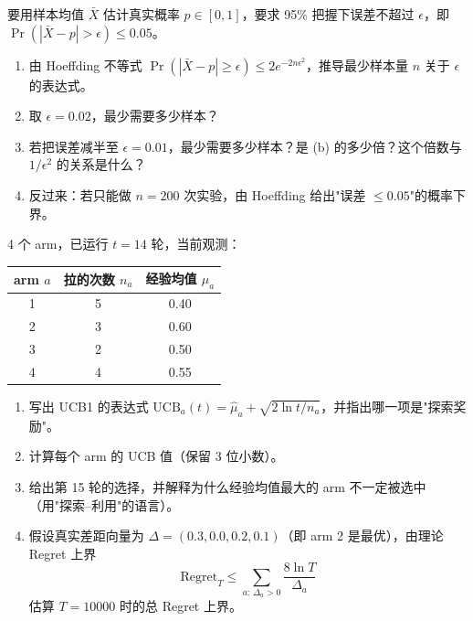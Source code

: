 \documentclass[12pt, a4paper]{ctexart}
\begin{document}
\begin{problem}
要用样本均值 $\bar{X}$ 估计真实概率 $p \in [0, 1]$，要求 95\% 把握下误差不超过 $\epsilon$，即 $\Pr(|\bar{X} - p| > \epsilon) \leq 0.05$。

\begin{enumerate}[label=(\alph*)]
    \item 由 Hoeffding 不等式 $\Pr(|\bar{X} - p| \geq \epsilon) \leq 2 e^{-2 n \epsilon^2}$，推导最少样本量 $n$ 关于 $\epsilon$ 的表达式。
    \item 取 $\epsilon = 0.02$，最少需要多少样本？
    \item 若把误差减半至 $\epsilon = 0.01$，最少需要多少样本？是 (b) 的多少倍？这个倍数与 $1/\epsilon^2$ 的关系是什么？
    \item 反过来：若只能做 $n = 200$ 次实验，由 Hoeffding 给出"误差 $\leq 0.05$"的概率下界。
\end{enumerate}
\end{problem}

\begin{problem}[第 8 题：UCB 决策]
4 个 arm，已运行 $t = 14$ 轮，当前观测：

\begin{center}
\begin{tabular}{c|c|c}
\toprule
arm $a$ & 拉的次数 $n_a$ & 经验均值 $\hat{\mu}_a$ \\
\midrule
1 & 5 & 0.40 \\
2 & 3 & 0.60 \\
3 & 2 & 0.50 \\
4 & 4 & 0.55 \\
\bottomrule
\end{tabular}
\end{center}

\begin{enumerate}[label=(\alph*)]
    \item 写出 UCB1 的表达式 $\mathrm{UCB}_a(t) = \hat{\mu}_a + \sqrt{2 \ln t / n_a}$，并指出哪一项是"探索奖励"。
    \item 计算每个 arm 的 UCB 值（保留 3 位小数）。
    \item 给出第 15 轮的选择，并解释为什么经验均值最大的 arm 不一定被选中（用"探索--利用"的语言）。
    \item 假设真实差距向量为 $\Delta = (0.3, 0.0, 0.2, 0.1)$（即 arm 2 是最优），由理论 Regret 上界
    \[
    \mathrm{Regret}_T \leq \sum_{a:\, \Delta_a > 0} \frac{8 \ln T}{\Delta_a}
    \]
    估算 $T = 10000$ 时的总 Regret 上界。
\end{enumerate}
\end{problem}
\end{document}
